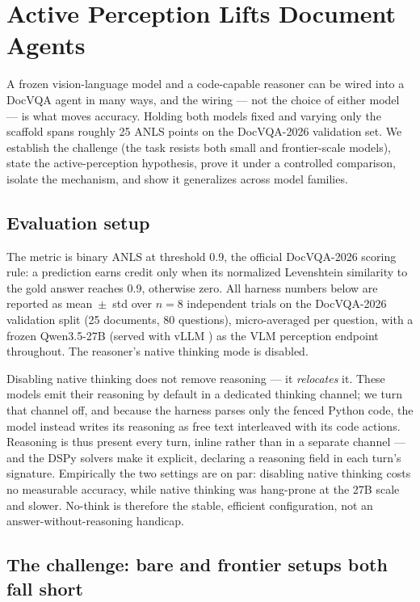 \section{Active Perception Lifts Document Agents}
\label{sec:harness}

A frozen vision-language model and a code-capable reasoner can be wired into a DocVQA agent in many ways, and the wiring --- not the choice of either model --- is what moves accuracy. Holding both models fixed and varying only the scaffold spans roughly 25 ANLS points on the DocVQA-2026 validation set. We establish the challenge (the task resists both small and frontier-scale models), state the active-perception hypothesis, prove it under a controlled comparison, isolate the mechanism, and show it generalizes across model families.

\subsection{Evaluation setup}
\label{sec:setup}

The metric is binary ANLS at threshold 0.9, the official DocVQA-2026 scoring rule: a prediction earns credit only when its normalized Levenshtein similarity to the gold answer reaches 0.9, otherwise zero. All harness numbers below are reported as mean~$\pm$~std over $n{=}8$ independent trials on the DocVQA-2026 validation split (25 documents, 80 questions), micro-averaged per question, with a frozen Qwen3.5-27B (served with vLLM \citep{vllm}) as the VLM perception endpoint throughout. The reasoner's native thinking mode is disabled.

Disabling native thinking does not remove reasoning --- it \emph{relocates} it. These models emit their reasoning by default in a dedicated thinking channel; we turn that channel off, and because the harness parses only the fenced Python code, the model instead writes its reasoning as free text interleaved with its code actions. Reasoning is thus present every turn, inline rather than in a separate channel --- and the DSPy solvers \citep{dspy} make it explicit, declaring a reasoning field in each turn's signature. Empirically the two settings are on par: disabling native thinking costs no measurable accuracy, while native thinking was hang-prone at the 27B scale and slower. No-think is therefore the stable, efficient configuration, not an answer-without-reasoning handicap.

\subsection{The challenge: bare and frontier setups both fall short}

